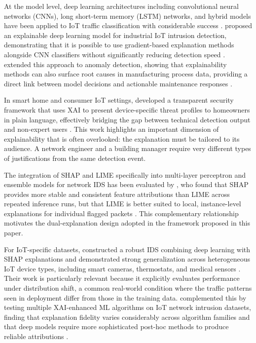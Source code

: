 \documentclass[a4paper,fleqn]{cas-dc}
\numberwithin{equation}{section}
\begin{document}
At the model level, deep learning architectures including convolutional neural networks (CNNs), long short-term memory (LSTM) networks, and hybrid models have been applied to IoT traffic classification with considerable success \cite{saheed2022explainable, chen2022explainable}. \citeauthor{saheed2022explainable} proposed an explainable deep learning model for industrial IoT intrusion detection, demonstrating that it is possible to use gradient-based explanation methods alongside CNN classifiers without significantly reducing detection speed \cite{saheed2022explainable}. \citeauthor{chen2022explainable} extended this approach to anomaly detection, showing that explainability methods can also surface root causes in manufacturing process data, providing a direct link between model decisions and actionable maintenance responses \cite{chen2022explainable}.

In smart home and consumer IoT settings, \citeauthor{zolanvari2021transparent} developed a transparent security framework that uses XAI to present device-specific threat profiles to homeowners in plain language, effectively bridging the gap between technical detection output and non-expert users \cite{zolanvari2021transparent}. This work highlights an important dimension of explainability that is often overlooked: the explanation must be tailored to its audience. A network engineer and a building manager require very different types of justifications from the same detection event.

The integration of SHAP and LIME specifically into multi-layer perceptron and ensemble models for network IDS has been evaluated by \citeauthor{ieee2024limeshap}, who found that SHAP provides more stable and consistent feature attributions than LIME across repeated inference runs, but that LIME is better suited to local, instance-level explanations for individual flagged packets \cite{ieee2024limeshap}. This complementary relationship motivates the dual-explanation design adopted in the framework proposed in this paper.

For IoT-specific datasets, \citeauthor{islam2023robust} constructed a robust IDS combining deep learning with SHAP explanations and demonstrated strong generalization across heterogeneous IoT device types, including smart cameras, thermostats, and medical sensors \cite{islam2023robust}. Their work is particularly relevant because it explicitly evaluates performance under distribution shift, a common real-world condition where the traffic patterns seen in deployment differ from those in the training data. \citeauthor{jes2024iot} complemented this by testing multiple XAI-enhanced ML algorithms on IoT network intrusion datasets, finding that explanation fidelity varies considerably across algorithm families and that deep models require more sophisticated post-hoc methods to produce reliable attributions \cite{jes2024iot}.
\end{document}
